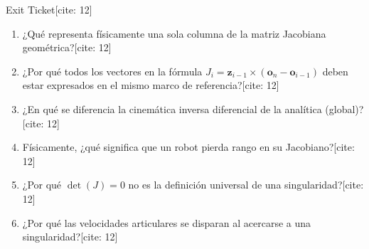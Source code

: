 \documentclass[aspectratio=169, xcolor={table,xcdraw}]{beamer}
\begin{document}
\begin{frame}{Exit Ticket[cite: 12]}
    \begin{tcolorbox}[colback=white, colframe=ucbblue, title=Verificación de Consolidación]
        \begin{enumerate}
            \item ¿Qué representa físicamente una sola columna de la matriz Jacobiana geométrica?[cite: 12]
            \item ¿Por qué todos los vectores en la fórmula $J_i = \mathbf{z}_{i-1} \times (\mathbf{o}_n - \mathbf{o}_{i-1})$ deben estar expresados en el mismo marco de referencia?[cite: 12]
            \item ¿En qué se diferencia la cinemática inversa diferencial de la analítica (global)?[cite: 12]
            \item Físicamente, ¿qué significa que un robot pierda rango en su Jacobiano?[cite: 12]
            \item ¿Por qué $\det(J) = 0$ no es la definición universal de una singularidad?[cite: 12]
            \item ¿Por qué las velocidades articulares se disparan al acercarse a una singularidad?[cite: 12]
        \end{enumerate}
    \end{tcolorbox}
\end{frame}
\end{document}
